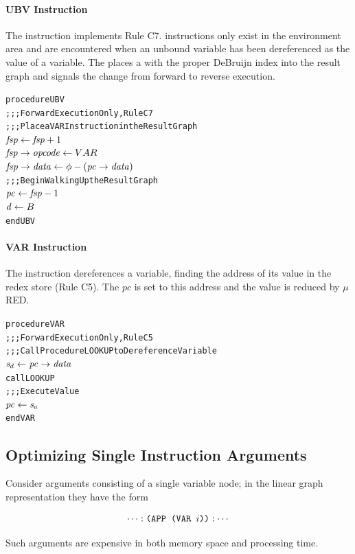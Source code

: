 \paragraph{UBV Instruction}

The  instruction implements Rule C7.  instructions only exist in the environment area and are encountered when an unbound variable has been dereferenced as the value of a variable. The  places a  with the proper DeBruijn index into the result graph and signals the change from forward to reverse execution.

\begin{alltt}
procedure UBV
  ;;; Forward Execution Only, Rule C7
  ;;; Place a VAR Instruction in the Result Graph
  \(\rt{fsp} \leftarrow \rt{fsp}+1\)
  \(\rtfield{fsp}{opcode} \leftarrow VAR\)
  \(\rtfield{fsp}{data} \leftarrow \phi-(\rtfield{pc}{data})\)
  ;;; Begin Walking Up the Result Graph
  \(\rt{pc} \leftarrow \rt{fsp}-1\)
  \(\rt{d} \leftarrow B\)
end UBV
\end{alltt}

\paragraph{VAR Instruction}

The  instruction dereferences a variable, finding the address of its value in the redex store (Rule C5). The \(pc\) is set to this address and the value is reduced by \(\mu\)RED.


\begin{alltt}
procedure VAR
  ;;; Forward Execution Only, Rule C5
  ;;; Call Procedure LOOKUP to Dereference Variable
  \(\rtsd \leftarrow \rtfield{pc}{data}\)
  call LOOKUP
  ;;; Execute Value
  \(\rt{pc} \leftarrow \rtsa\)
end VAR
\end{alltt}

\subsection{Optimizing Single Instruction Arguments}

Consider arguments consisting of a single variable node; in the linear graph representation
they have the form

\[
\cdots:\texttt{(APP (VAR }i\texttt{))}:\cdots
\]

Such arguments are expensive in both memory space and processing time.

